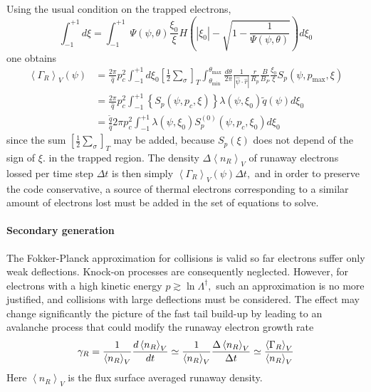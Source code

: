 Using the usual condition on the trapped electrons,
\begin{equation}
\int_{-1}^{+1}d\xi =\int_{-1}^{+1}\;\Psi \left( \psi ,\theta \right) \frac{
\xi _{0}}{\xi }H\left( \left| \xi _{0}\right| -\sqrt{1-\frac{1}{\Psi \left(
\psi ,\theta \right) }}\right) d\xi _{0}
\end{equation}
one obtains
\begin{align}
\left\langle \Gamma _{R}\right\rangle _{V}\left( \psi \right) & =\frac{2\pi
}{\widehat{q}}p_{c}^{2}\int_{-1}^{+1}d\xi _{0}\left[ \frac{1}{2}\sum_{\sigma
}\right] _{T}\int_{\theta _{\min }}^{\theta _{\max }}\frac{d\theta }{2\pi }%
\frac{1}{\left| \widehat{\psi }\cdot \widehat{r}\right| }\frac{r}{R_{p}}%
\frac{B}{B_{P}}\frac{\xi _{0}}{\xi }S_{p}\left( \psi ,p_{\max },\xi \right)
\nonumber \\
& =\frac{2\pi }{\widehat{q}}p_{c}^{2}\int_{-1}^{+1}\left\{ S_{p}\left( \psi
,p_{c},\xi \right) \right\} \lambda \left( \psi ,\xi _{0}\right) \widetilde{q%
}\left( \psi \right) d\xi _{0}  \nonumber \\
& =\frac{\widetilde{q}}{\widehat{q}}2\pi p_{c}^{2}\int_{-1}^{+1}\lambda
\left( \psi ,\xi _{0}\right) S_{p}^{\left( 0\right) }\left( \psi ,p_{c},\xi
_{0}\right) d\xi _{0}
\end{align}
since the sum $\left[ \frac{1}{2}\sum_{\sigma }\right] _{T}$ may be added,
because $S_{p}\left( \xi \right) $ does not depend of the sign of $\xi .$ in
the trapped region. The density $\Delta \left\langle n_{R}\right\rangle _{V}$
of runaway electrons lossed per time step $\Delta t$ is then simply $%
\left\langle \Gamma _{R}\right\rangle _{V}\left( \psi \right) \Delta t,$ and
in order to preserve the code conservative, a source of thermal electrons
corresponding to a similar amount of electrons lost must be added in the set
of equations to solve.

\paragraph{Secondary generation}

The Fokker-Planck approximation for collisions is valid so far electrons
suffer only weak deflections. Knock-on processes are consequently neglected.
However, for electrons with a high kinetic energy $p\gtrsim \ln \Lambda
^{\dag },$ such an approximation is no more justified, and collisions with
large deflections must be considered. The effect may change significantly
the picture of the fast tail build-up by leading to an avalanche process
that could modify the runaway electron growth rate
\begin{equation}
\gamma _{R}=\frac{1}{\left\langle n_{R}\right\rangle _{V}}\frac{
d\left\langle n_{R}\right\rangle _{V}}{dt}\simeq \frac{1}{\left\langle
n_{R}\right\rangle _{V}}\frac{\Delta \left\langle n_{R}\right\rangle _{V}}{
\Delta t}\simeq \frac{\left\langle \Gamma _{R}\right\rangle _{V}}{%
\left\langle n_{R}\right\rangle _{V}}
\end{equation}
Here $\left\langle n_{R}\right\rangle _{V}$ is the flux surface averaged
runaway density.

